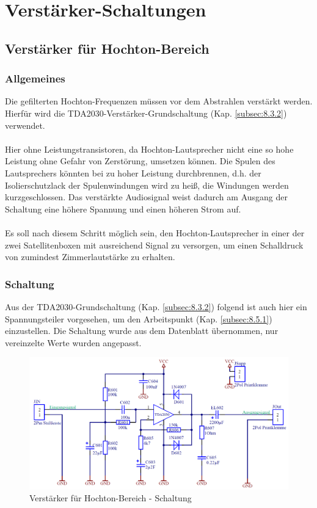 
\section{Verstärker-Schaltungen}


\subsection{Verstärker für Hochton-Bereich}\label{subsec:5.1}
\subsubsection{Allgemeines}\label{subsec:5.1.1}
Die gefilterten Hochton-Frequenzen müssen vor dem Abstrahlen verstärkt werden.
Hierfür wird die TDA2030-Verstärker-Grundschaltung (Kap. \ref{subsec:8.3.2}) verwendet.
\\ \\
Hier ohne Leistungstransistoren, da Hochton-Lautsprecher nicht eine so hohe Leistung ohne Gefahr von Zerstörung, umsetzen können.
Die Spulen des Lautsprechers könnten bei zu hoher Leistung durchbrennen, d.h. der Isolierschutzlack der Spulenwindungen wird zu heiß, die Windungen werden kurzgeschlossen.
Das verstärkte Audiosignal weist dadurch am Ausgang der Schaltung eine höhere Spannung und einen höheren Strom auf.
\\ \\
Es soll nach diesem Schritt möglich sein, den Hochton-Lautsprecher in einer der zwei Satellitenboxen mit ausreichend Signal zu versorgen, um einen Schalldruck von zumindest Zimmerlautstärke zu erhalten. 

\newpage
\subsubsection{Schaltung}\label{subsec:5.1.2}
Aus der TDA2030-Grundschaltung (Kap. \ref{subsec:8.3.2}) folgend ist auch hier ein Spannungsteiler vorgesehen, um den Arbeitspunkt (Kap. \ref{subsec:8.5.1}) einzustellen.
Die Schaltung wurde aus dem Datenblatt übernommen, nur vereinzelte Werte wurden angepasst. 

\begin{figure} [H]
	\centering	
	\includegraphics[width=1\textwidth]{img/Print6/HTVerstaerker-Schem.PNG}
	\caption{Verstärker für Hochton-Bereich - Schaltung}
	\label {fig:5.1.2.1}
\end{figure}

